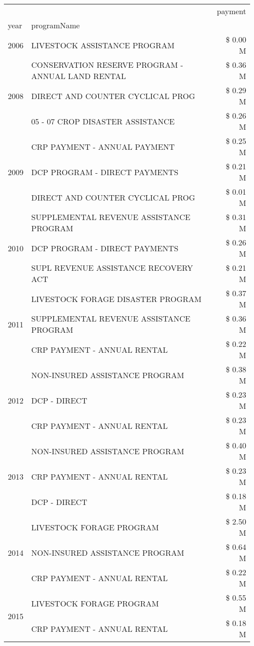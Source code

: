 \begin{tabular}{llr}
\toprule
 &  & payment \\
year & programName &  \\
\midrule
2006 & LIVESTOCK ASSISTANCE PROGRAM & \$ 0.00 M \\
\cline{1-3}
\multirow[t]{3}{*}{2008} & CONSERVATION RESERVE PROGRAM - ANNUAL LAND RENTAL & \$ 0.36 M \\
 & DIRECT AND COUNTER CYCLICAL PROG & \$ 0.29 M \\
 & 05 - 07 CROP DISASTER ASSISTANCE & \$ 0.26 M \\
\cline{1-3}
\multirow[t]{3}{*}{2009} & CRP PAYMENT - ANNUAL PAYMENT & \$ 0.25 M \\
 & DCP PROGRAM - DIRECT PAYMENTS & \$ 0.21 M \\
 & DIRECT AND COUNTER CYCLICAL PROG & \$ 0.01 M \\
\cline{1-3}
\multirow[t]{3}{*}{2010} & SUPPLEMENTAL REVENUE ASSISTANCE PROGRAM & \$ 0.31 M \\
 & DCP PROGRAM - DIRECT PAYMENTS & \$ 0.26 M \\
 & SUPL REVENUE ASSISTANCE RECOVERY ACT & \$ 0.21 M \\
\cline{1-3}
\multirow[t]{3}{*}{2011} & LIVESTOCK FORAGE DISASTER PROGRAM & \$ 0.37 M \\
 & SUPPLEMENTAL REVENUE ASSISTANCE PROGRAM & \$ 0.36 M \\
 & CRP PAYMENT - ANNUAL RENTAL & \$ 0.22 M \\
\cline{1-3}
\multirow[t]{3}{*}{2012} & NON-INSURED ASSISTANCE PROGRAM & \$ 0.38 M \\
 & DCP - DIRECT & \$ 0.23 M \\
 & CRP PAYMENT - ANNUAL RENTAL & \$ 0.23 M \\
\cline{1-3}
\multirow[t]{3}{*}{2013} & NON-INSURED ASSISTANCE PROGRAM & \$ 0.40 M \\
 & CRP PAYMENT - ANNUAL RENTAL & \$ 0.23 M \\
 & DCP - DIRECT & \$ 0.18 M \\
\cline{1-3}
\multirow[t]{3}{*}{2014} & LIVESTOCK FORAGE PROGRAM & \$ 2.50 M \\
 & NON-INSURED ASSISTANCE PROGRAM & \$ 0.64 M \\
 & CRP PAYMENT - ANNUAL RENTAL & \$ 0.22 M \\
\cline{1-3}
\multirow[t]{3}{*}{2015} & LIVESTOCK FORAGE PROGRAM & \$ 0.55 M \\
 & CRP PAYMENT - ANNUAL RENTAL & \$ 0.18 M \\

\end{tabular}
